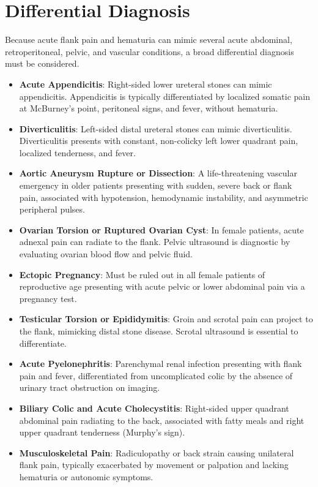\section*{Differential Diagnosis}
Because acute flank pain and hematuria can mimic several acute abdominal, retroperitoneal, pelvic, and vascular conditions, a broad differential diagnosis must be considered.
\begin{itemize}
\item \textbf{Acute Appendicitis}: Right-sided lower ureteral stones can mimic appendicitis. Appendicitis is typically differentiated by localized somatic pain at McBurney's point, peritoneal signs, and fever, without hematuria.
\item \textbf{Diverticulitis}: Left-sided distal ureteral stones can mimic diverticulitis. Diverticulitis presents with constant, non-colicky left lower quadrant pain, localized tenderness, and fever.
\item \textbf{Aortic Aneurysm Rupture or Dissection}: A life-threatening vascular emergency in older patients presenting with sudden, severe back or flank pain, associated with hypotension, hemodynamic instability, and asymmetric peripheral pulses.
\item \textbf{Ovarian Torsion or Ruptured Ovarian Cyst}: In female patients, acute adnexal pain can radiate to the flank. Pelvic ultrasound is diagnostic by evaluating ovarian blood flow and pelvic fluid.
\item \textbf{Ectopic Pregnancy}: Must be ruled out in all female patients of reproductive age presenting with acute pelvic or lower abdominal pain via a pregnancy test.
\item \textbf{Testicular Torsion or Epididymitis}: Groin and scrotal pain can project to the flank, mimicking distal stone disease. Scrotal ultrasound is essential to differentiate.
\item \textbf{Acute Pyelonephritis}: Parenchymal renal infection presenting with flank pain and fever, differentiated from uncomplicated colic by the absence of urinary tract obstruction on imaging.
\item \textbf{Biliary Colic and Acute Cholecystitis}: Right-sided upper quadrant abdominal pain radiating to the back, associated with fatty meals and right upper quadrant tenderness (Murphy's sign).
\item \textbf{Musculoskeletal Pain}: Radiculopathy or back strain causing unilateral flank pain, typically exacerbated by movement or palpation and lacking hematuria or autonomic symptoms.
\end{itemize}


